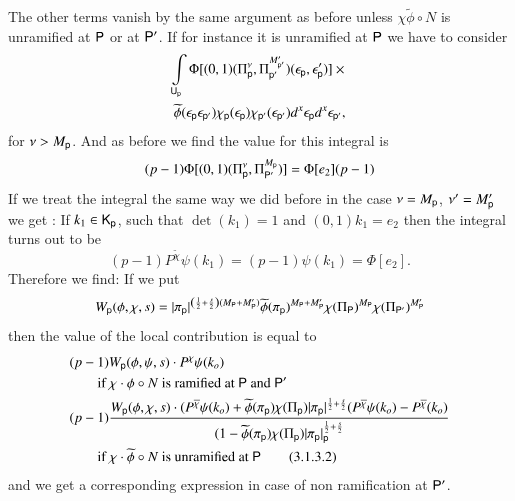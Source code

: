 The other terms vanish by the same argument as before unless $\chi\widetilde{\phi}\circ N$ is unramified at $\mathsf{P}$ or at $\mathsf{P}'$. If for instance it is unramified at $\mathsf{P}$ we have to consider
\begin{gather*}
\int\limits_{\mathsf{U}_{\mathsf{p}}}\Phi[(0,1)(\Pi^{\nu}_{\mathsf{p}},\Pi^{M'_{\mathsf{p}'}}_{\mathsf{p}'})(\epsilon_{\mathsf{p}},\epsilon'_{\mathsf{p}})]\times{}\\
\widetilde{\phi}(\epsilon_{\mathsf{p}}\epsilon_{\mathsf{p}'})\chi_{\mathsf{p}}(\epsilon_{\mathsf{p}})\chi_{\mathsf{p}'}(\epsilon_{\mathsf{p}'})d^{x}\epsilon_{\mathsf{p}}d^{x}\epsilon_{\mathsf{p}'},
\end{gather*}
for $\nu>M_{\mathsf{p}}$. And as before we find the value for this integral is
$$
(p-1)\Phi[(0,1)(\Pi^{\nu}_{\mathsf{p}},\Pi^{M_{\mathsf{p}}}_{\mathsf{P}'})]=\Phi[e_{2}](p-1)
$$
If we treat the integral the same way we did before in the case $\nu=M_{\mathsf{p}}$, $\nu'=M'_{\mathsf{p}}$ we get : If $k_{1}\in\mathsf{K}_{\mathsf{p}}$, such that $\det(k_{1})=1$ and $(0,1)k_{1}=e_{2}$ then the integral turns out to be
$$
(p-1)P^{\widetilde{\chi}}\psi(k_{1})=(p-1)\psi(k_{1})=\Phi[e_{2}].
$$\pageoriginale
Therefore we find: If we put
$$
W_{\mathsf{p}}(\phi,\chi,s)=|\pi_{\mathsf{p}}|^{\left(\frac{1}{2}+\frac{s}{2}\right)(M_{\mathsf{P}}+M'_{\mathsf{P}})}\widetilde{\phi}(\pi_{\mathsf{p}})^{M_{\mathsf{P}}+M'_{\mathsf{P}}}\chi(\Pi_{\mathsf{P}})^{M_{\mathsf{P}}}\chi(\Pi_{\mathsf{P}'})^{M'_{\mathsf{P}}}
$$
then the value of the local contribution is equal to
\begin{align*}
& (p-1)W_{\mathsf{p}}(\phi,\psi,s)\cdot P^{\chi}\psi(k_{o})\\
&\qquad \text{if $\chi\cdot \phi\circ N$ is ramified at $\mathsf{P}$ and $\mathsf{P}'$}\\
& (p-1)\dfrac{W_{\mathsf{p}}(\phi,\chi,s)\cdot (P^{\overline{\chi}}\psi(k_{o})+\widetilde{\phi}(\pi_{\mathsf{p}})\chi(\Pi_{\mathsf{p}})|\pi_{\mathsf{p}}|^{\frac{1}{2}+\frac{s}{2}}(P^{\overline{\chi}}\psi(k_{o})-P^{\overline{\chi}}(k_{o})}{(1-\widetilde{\phi}(\pi_{\mathsf{p}})\chi(\Pi_{\mathsf{p}})|\pi_{\mathsf{p}}|^{\frac{1}{2}+\frac{s}{2}}_{\mathsf{p}}}\\
&\qquad \text{if $\chi\cdot \widetilde{\phi}\circ N$ is unramified at $\mathsf{P}$}\tag{3.1.3.2}\label{art2-eq3.1.3.2}
\end{align*}
and we get a corresponding expression in case of non ramification at $\mathsf{P}'$.

